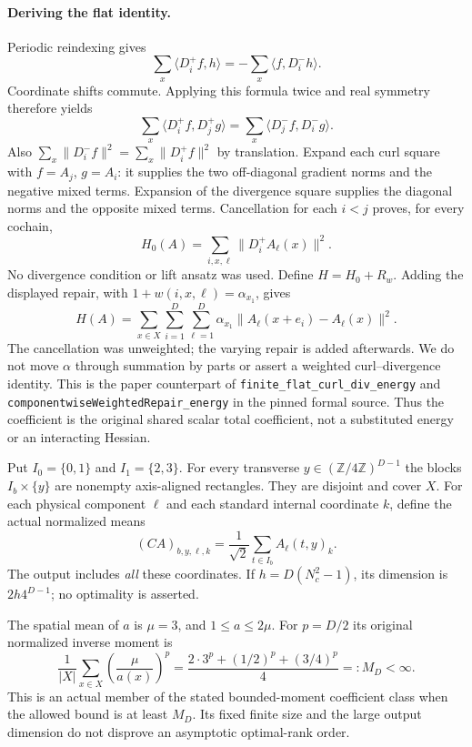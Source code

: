 \paragraph{Deriving the flat identity.}
Periodic reindexing gives
\[
 \sum_x\langle D_i^+f,h\rangle=-\sum_x\langle f,D_i^-h\rangle.
\]
Coordinate shifts commute. Applying this formula twice and real symmetry
therefore yields
\[
 \sum_x\langle D_i^+f,D_j^+g\rangle
 =\sum_x\langle D_j^-f,D_i^-g\rangle.
\]
Also $\sum_x\|D_i^-f\|^2=\sum_x\|D_i^+f\|^2$ by translation.
Expand each curl square with $f=A_j$, $g=A_i$: it supplies the two
off-diagonal gradient norms and the negative mixed terms. Expansion of
the divergence square supplies the diagonal norms and the opposite
mixed terms. Cancellation for each $i<j$ proves, for every cochain,
\[
 H_0(A)=\sum_{i,x,\ell}\|D_i^+A_\ell(x)\|^2.
\]
No divergence condition or lift ansatz was used. Define $H=H_0+R_w$.
Adding the displayed repair, with $1+w(i,x,\ell)=\alpha_{x_1}$, gives
\begin{equation}\label{eq:actual-cycle-energy}
 H(A)=\sum_{x\in X}\sum_{i=1}^D\sum_{\ell=1}^D
 \alpha_{x_1}\|A_\ell(x+e_i)-A_\ell(x)\|^2.
\end{equation}
The cancellation was unweighted; the varying repair is added afterwards.
We do not move $\alpha$ through summation by parts or assert a weighted
curl--divergence identity. This is the paper counterpart of
\texttt{finite\_flat\_curl\_div\_energy} and
\texttt{componentwiseWeightedRepair\_energy} in the pinned formal source.
Thus the coefficient is the original shared scalar total coefficient,
not a substituted energy or an interacting Hessian.

Put $I_0=\{0,1\}$ and $I_1=\{2,3\}$. For every transverse
$y\in(\mathbb Z/4\mathbb Z)^{D-1}$ the blocks $I_b\times\{y\}$
are nonempty axis-aligned rectangles. They are disjoint and cover $X$.
For each physical component $\ell$ and each standard internal coordinate $k$,
define the actual normalized means
\begin{equation}\label{eq:actual-cycle-C}
 (CA)_{b,y,\ell,k}=\frac{1}{\sqrt2}\sum_{t\in I_b} A_\ell(t,y)_k.
\end{equation}
The output includes \emph{all} these coordinates. If
$h=D(N_c^2-1)$, its dimension is $2h4^{D-1}$; no optimality is asserted.

The spatial mean of $a$ is $\mu=3$, and $1\leq a\leq2\mu$.
For $p=D/2$ its original normalized inverse moment is
\begin{equation}\label{eq:actual-cycle-moment}
 \frac1{|X|}\sum_{x\in X}\left(\frac{\mu}{a(x)}\right)^p
   =\frac{2\cdot3^p+(1/2)^p+(3/4)^p}{4}=:M_D<\infty.
\end{equation}
This is an actual member of the stated bounded-moment coefficient class
when the allowed bound is at least $M_D$. Its fixed finite size and the
large output dimension do not disprove an asymptotic optimal-rank order.

